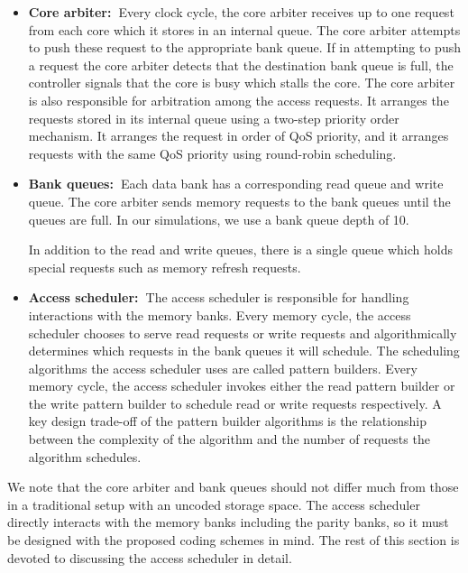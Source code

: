 \begin{itemize}
\item \textbf{Core arbiter:~}Every clock cycle, the core arbiter receives up to one request from each core which it stores in an internal queue. The core arbiter attempts to push these request to the appropriate bank queue. If in attempting to push a request the core arbiter detects that the destination bank queue is full, the controller signals that the core is busy which stalls the core. The core arbiter is also responsible for arbitration among the access requests. It arranges the requests stored in its internal queue using a two-step priority order mechanism. It arranges the request in order of QoS priority, and it arranges requests with the same QoS priority using round-robin scheduling.

\item \textbf{Bank queues:~}Each data bank has a corresponding read queue and write queue.  The core arbiter sends memory requests to the bank queues until the queues are full. In our simulations, we use a bank queue depth of 10. 

In addition to the read and write queues, there is a single queue which holds special requests such as memory refresh requests.

\item \textbf{Access scheduler:~}The access scheduler is responsible for handling interactions with the memory banks. Every memory cycle, the access scheduler chooses to serve read requests or write requests and algorithmically determines which requests in the bank queues it will schedule. The scheduling algorithms the access scheduler uses are called pattern builders. Every memory cycle, the access scheduler invokes either the read pattern builder or the write pattern builder to schedule read or write requests respectively. A key design trade-off of the pattern builder algorithms is the relationship between the complexity of the algorithm and the number of requests the algorithm schedules.
\end{itemize}

We note that the core arbiter and bank queues should not differ much from those in a traditional setup with an uncoded storage space. The access scheduler directly interacts with the memory banks including the parity banks, so it must be designed with the proposed coding schemes in mind. The rest of this section is devoted to discussing the access scheduler in detail.


